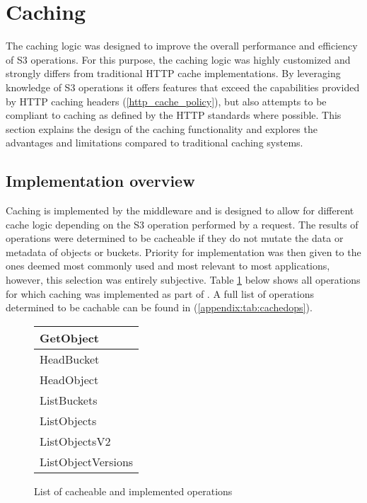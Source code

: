 \section{Caching}

The caching logic was designed to improve the overall performance and efficiency of S3 operations. For this purpose, the caching logic was highly customized and strongly differs from traditional HTTP cache implementations. By leveraging knowledge of S3 operations it offers features that exceed the capabilities provided by HTTP caching headers (\ref{http_cache_policy}), but also attempts to be compliant to caching as defined by the HTTP standards where possible. This section explains the design of the caching functionality and explores the advantages and limitations compared to traditional caching systems.

\subsection{Implementation overview}

Caching is implemented by the  middleware and is designed to allow for different cache logic depending on the S3 operation performed by a request. The results of operations were determined to be cacheable if they do not mutate the data or metadata of objects or buckets. Priority for implementation was then given to the ones deemed most commonly used and most relevant to most applications, however, this selection was entirely subjective. Table \ref{tab:cachedops} below shows all operations for which caching was implemented as part of . A full list of operations determined to be cachable can be found in (\ref{appendix:tab:cachedops}).
\begin{figure}[h]
	\begin{center}
		\begin{tabular}{| l |}
			\hline
			GetObject \\ \hline
			HeadBucket \\ \hline
			HeadObject \\ \hline
			ListBuckets \\ \hline
			ListObjects \\ \hline
			ListObjectsV2 \\ \hline
			ListObjectVersions \\ \hline
		\end{tabular}
	\end{center}
	\caption{List of cacheable and implemented operations}
	\label{tab:cachedops}
\end{figure}

